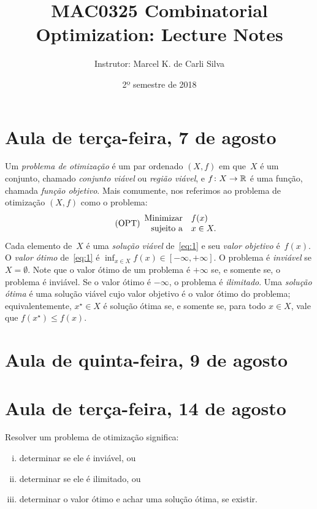 \documentclass[10pt,reqno]{amsart}
\title{MAC0325 Combinatorial Optimization: Lecture Notes}
\author{Instrutor: Marcel {K.} de Carli Silva}
\date{2º semestre de 2018}
\begin{document}
\begin{abstract}

\end{abstract}

\maketitle

\tableofcontents

\section{Aula de terça-feira, 7 de agosto}

Um \emph{problema de otimização} é um par ordenado \((X,f)\) em que~\(X\) é um
conjunto, chamado \emph{conjunto viável} ou \emph{região viável}, e
\(f \colon X \to \mathbb{R}\) é uma função, chamada \emph{função objetivo}. Mais
comumente, nos referimos ao problema de otimização \((X,f)\) como o problema:
\begin{equation}
  \label{eq:1}
  \tag{OPT}
  \begin{array}{{rl}}
    \text{Minimizar} & f(x)     \\
    \text{sujeito a} & x \in X. \\
  \end{array}
\end{equation}
Cada elemento de~\(X\) é uma \emph{solução viável} de~\eqref{eq:1} e
seu \emph{valor objetivo} é~\(f(x)\).  O \emph{valor ótimo}
de~\eqref{eq:1} é \(\inf_{x \in X}f(x) \in [-\infty,+\infty]\).  O
problema é \emph{inviável} se \(X = \emptyset\). Note que o valor
ótimo de um problema é \(+\infty\) se, e somente se, o problema é
inviável. Se o valor ótimo é \(-\infty\), o problema é
\emph{ilimitado}. Uma \emph{solução ótima} é uma solução viável cujo
valor objetivo é o valor ótimo do problema; equivalentemente,
\(x^{\star} \in X\) é solução ótima se, e somente se, para todo
\(x \in X\), vale que \(f(x^{\star}) \leq f(x)\).

\section{Aula de quinta-feira, 9 de agosto}

\section{Aula de terça-feira, 14 de agosto}

Resolver um problema de otimização significa:
\begin{enumerate}[(i)]
\item determinar se ele é inviável, ou
\item determinar se ele é ilimitado, ou
\item determinar o valor ótimo e achar uma solução ótima, se existir.
\end{enumerate}
\end{document}
